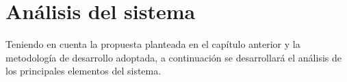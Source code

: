 
\section{Análisis del sistema}
Teniendo en cuenta la propuesta planteada en el capítulo anterior y la metodología de desarrollo adoptada, a continuación se desarrollará el análisis de los principales elementos del sistema. 
%
%
%
